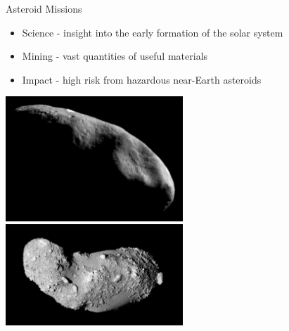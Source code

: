 \begin{frame}{Asteroid Missions}
\begin{itemize}
    \item Science - insight into the early formation of the solar system
    \item Mining - vast quantities of useful materials
    \item Impact - high risk from hazardous near-Earth asteroids
\end{itemize}    

\begin{center}
    \includegraphics[height=0.5\textheight,width=0.5\textwidth,keepaspectratio]{figures/defense/near_mos_20001203_full.jpg}
    ~
    \includegraphics[height=0.5\textheight,width=0.5\textwidth,keepaspectratio]{figures/defense/Itokawa8_hayabusa_1210.jpg}
\end{center}
\end{frame}

